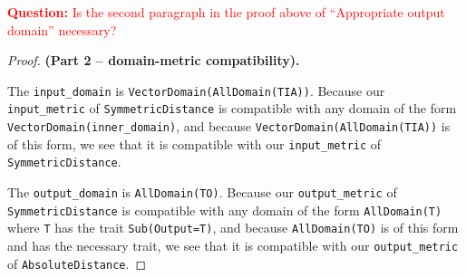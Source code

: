 \documentclass[12pt,letterpaper]{article}
\newcommand{\question}[1]{\textcolor{red}{\textbf{Question:} #1}}
\theoremstyle{definition}
\begin{document}
\question{Is the second paragraph in the proof above of ``Appropriate output domain'' necessary?}

\begin{proof} \textbf{(Part 2 -- domain-metric compatibility).}

The \texttt{input\_domain} is \texttt{VectorDomain(AllDomain(TIA))}. Because our \texttt{input\_metric} of \texttt{SymmetricDistance} is compatible with any domain of the form \\\texttt{VectorDomain(inner\_domain)}, and because \texttt{VectorDomain(AllDomain(TIA))} is of this form, we see that it is compatible with our \texttt{input\_metric} of \texttt{SymmetricDistance}.

The \texttt{output\_domain} is \texttt{AllDomain(TO)}. Because our \texttt{output\_metric} of \texttt{SymmetricDistance} is compatible with any domain of the form \texttt{AllDomain(T)} where \texttt{T} has the trait \texttt{Sub(Output=T)}, and because \texttt{AllDomain(TO)} is of this form and has the necessary trait, we see that it is compatible with our \texttt{output\_metric} of \texttt{AbsoluteDistance}.
\end{proof}
\end{document}
